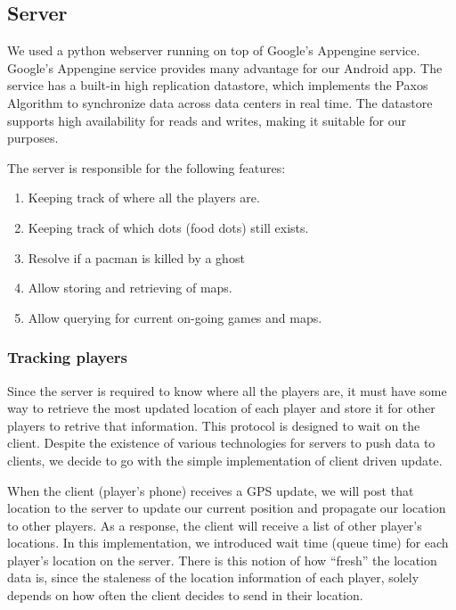 \documentclass{acm_proc_article-sp}
\begin{document}
\subsection{Server}

We used a python webserver running on top of Google's Appengine
service. Google's Appengine service provides many advantage for our
Android app. The service has a built-in high replication datastore,
which implements the Paxos Algorithm to synchronize data across data
centers in real time. The datastore supports high availability for
reads and writes, making it suitable for our purposes.

The server is responsible for the following features:

\begin{enumerate}
\item Keeping track of where all the players are.
\item Keeping track of which dots (food dots) still exists.
\item Resolve if a pacman is killed by a ghost
\item Allow storing and retrieving of maps.
\item Allow querying for current on-going games and maps.
\end{enumerate}

\subsubsection{Tracking players}
Since the server is required to know where all the players are, it
must have some way to retrieve the most updated location of each
player and store it for other players to retrive that
information. This protocol is designed to wait on the client. Despite
the existence of various technologies for servers to push data to
clients, we decide to go with the simple implementation of client
driven update.

When the client (player's phone) receives a GPS update, we will post
that location to the server to update our current position and
propagate our location to other players. As a response, the client
will receive a list of other player's locations. In this
implementation, we introduced wait time (queue time) for each
player's location on the server. There is this notion of how ``fresh''
the location data is, since the staleness of the location information
of each player, solely depends on how often the client decides to send
in their location. 
\end{document}
